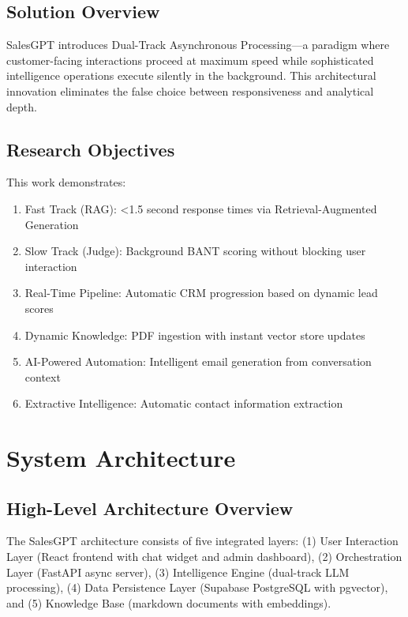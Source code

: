 \documentclass[10pt,twocolumn,a4paper]{article}
\begin{document}
\subsection{Solution Overview}

SalesGPT introduces Dual-Track Asynchronous Processing—a paradigm where customer-facing interactions proceed at maximum speed while sophisticated intelligence operations execute silently in the background. This architectural innovation eliminates the false choice between responsiveness and analytical depth.

\subsection{Research Objectives}

This work demonstrates:

\begin{enumerate}
    \item Fast Track (RAG): <1.5 second response times via Retrieval-Augmented Generation
    \item Slow Track (Judge): Background BANT scoring without blocking user interaction
    \item Real-Time Pipeline: Automatic CRM progression based on dynamic lead scores
    \item Dynamic Knowledge: PDF ingestion with instant vector store updates
    \item AI-Powered Automation: Intelligent email generation from conversation context
    \item Extractive Intelligence: Automatic contact information extraction
\end{enumerate}


\section{System Architecture}

\subsection{High-Level Architecture Overview}

The SalesGPT architecture consists of five integrated layers: (1) User Interaction Layer (React frontend with chat widget and admin dashboard), (2) Orchestration Layer (FastAPI async server), (3) Intelligence Engine (dual-track LLM processing), (4) Data Persistence Layer (Supabase PostgreSQL with pgvector), and (5) Knowledge Base (markdown documents with embeddings).
\end{document}
